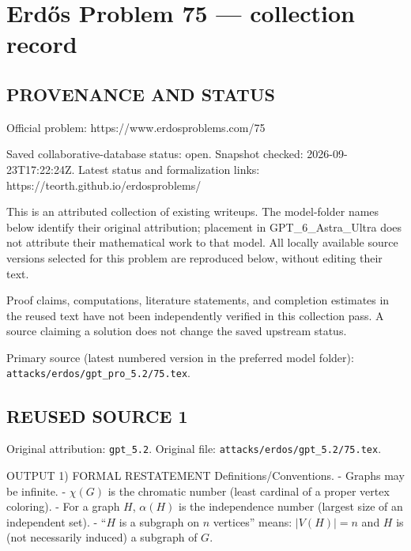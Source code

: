 \section*{Erd\H{o}s Problem 75 --- collection record}

\subsection*{PROVENANCE AND STATUS}
Official problem: https://www.erdosproblems.com/75

Saved collaborative-database status: open.
Snapshot checked: 2026-09-23T17:22:24Z.
Latest status and formalization links: https://teorth.github.io/erdosproblems/

This is an attributed collection of existing writeups. The model-folder names below identify their original attribution; placement in GPT\_6\_Astra\_Ultra does not attribute their mathematical work to that model. All locally available source versions selected for this problem are reproduced below, without editing their text.

Proof claims, computations, literature statements, and completion estimates in the reused text have not been independently verified in this collection pass. A source claiming a solution does not change the saved upstream status.

Primary source (latest numbered version in the preferred model folder): \texttt{attacks/erdos/gpt\_pro\_5.2/75.tex}.

\subsection*{REUSED SOURCE 1}
Original attribution: \texttt{gpt\_5.2}.
Original file: \texttt{attacks/erdos/gpt\_5.2/75.tex}.


OUTPUT
1) FORMAL RESTATEMENT
Definitions/Conventions.
- Graphs may be infinite.
- $\chi(G)$ is the chromatic number (least cardinal of a proper vertex coloring).
- For a graph $H$, $\alpha(H)$ is the independence number (largest size of an independent set).
- ``$H$ is a subgraph on $n$ vertices'' means: $|V(H)|=n$ and $H$ is (not necessarily induced) a subgraph of $G$.

